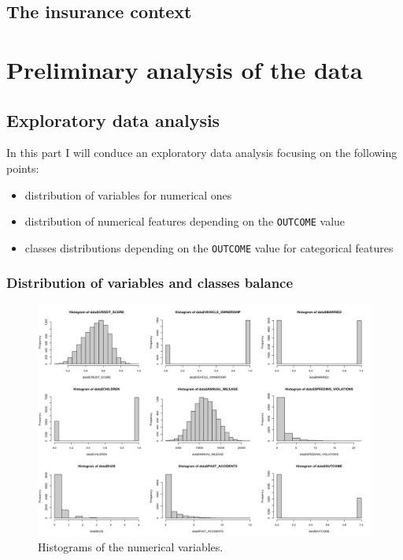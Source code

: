 \documentclass[a4paper,11pt]{article}
\begin{document}
\subsection{The insurance context}

\section{Preliminary analysis of the data}
\subsection{Exploratory data analysis}

In this part I will conduce an exploratory data analysis focusing on the following points:
\begin{itemize}
    \item distribution of variables for numerical ones
    \item distribution of numerical features depending on the {\tt OUTCOME} value
    \item classes distributions depending on the {\tt OUTCOME} value for categorical features
\end{itemize}

\subsubsection{Distribution of variables and classes balance}

\begin{figure}[!h]
    \centering
    \includegraphics[scale=0.35]{eda.jpeg}
    \caption{Histograms of the numerical variables.}
\end{figure}
\end{document}
